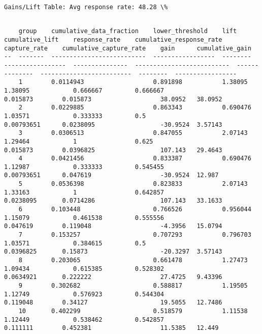 \documentclass[11pt]{article}
\begin{document}
    
    \begin{Verbatim}[commandchars=\\\{\}]
Gains/Lift Table: Avg response rate: 48.28 \%


    \end{Verbatim}

    
    \begin{verbatim}
    group    cumulative_data_fraction    lower_threshold    lift      cumulative_lift    response_rate    cumulative_response_rate    capture_rate    cumulative_capture_rate    gain      cumulative_gain
--  -------  --------------------------  -----------------  --------  -----------------  ---------------  --------------------------  --------------  -------------------------  --------  -----------------
    1        0.0114943                   0.891898           1.38095   1.38095            0.666667         0.666667                    0.015873        0.015873                   38.0952   38.0952
    2        0.0229885                   0.863343           0.690476  1.03571            0.333333         0.5                         0.00793651      0.0238095                  -30.9524  3.57143
    3        0.0306513                   0.847055           2.07143   1.29464            1                0.625                       0.015873        0.0396825                  107.143   29.4643
    4        0.0421456                   0.833387           0.690476  1.12987            0.333333         0.545455                    0.00793651      0.047619                   -30.9524  12.987
    5        0.0536398                   0.823833           2.07143   1.33163            1                0.642857                    0.0238095       0.0714286                  107.143   33.1633
    6        0.103448                    0.766526           0.956044  1.15079            0.461538         0.555556                    0.047619        0.119048                   -4.3956   15.0794
    7        0.153257                    0.707293           0.796703  1.03571            0.384615         0.5                         0.0396825       0.15873                    -20.3297  3.57143
    8        0.203065                    0.661478           1.27473   1.09434            0.615385         0.528302                    0.0634921       0.222222                   27.4725   9.43396
    9        0.302682                    0.588817           1.19505   1.12749            0.576923         0.544304                    0.119048        0.34127                    19.5055   12.7486
    10       0.402299                    0.518579           1.11538   1.12449            0.538462         0.542857                    0.111111        0.452381                   11.5385   12.449

\end{verbatim}
\end{document}
